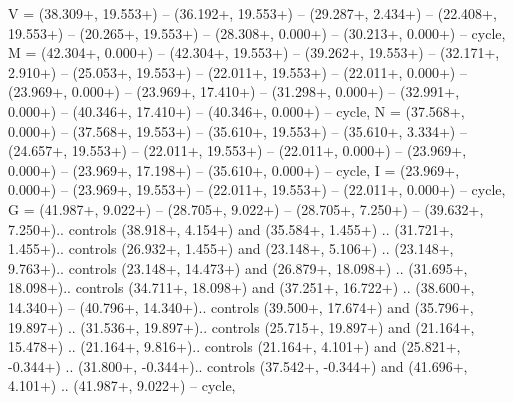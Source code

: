 {V} = {(38.309+\ctpXshift, 19.553+\ctpYshift) -- (36.192+\ctpXshift, 19.553+\ctpYshift) -- (29.287+\ctpXshift, 2.434+\ctpYshift) -- (22.408+\ctpXshift, 19.553+\ctpYshift) -- (20.265+\ctpXshift, 19.553+\ctpYshift) -- (28.308+\ctpXshift, 0.000+\ctpYshift) -- (30.213+\ctpXshift, 0.000+\ctpYshift) -- cycle},
{M} = {(42.304+\ctpXshift, 0.000+\ctpYshift) -- (42.304+\ctpXshift, 19.553+\ctpYshift) -- (39.262+\ctpXshift, 19.553+\ctpYshift) -- (32.171+\ctpXshift, 2.910+\ctpYshift) -- (25.053+\ctpXshift, 19.553+\ctpYshift) -- (22.011+\ctpXshift, 19.553+\ctpYshift) -- (22.011+\ctpXshift, 0.000+\ctpYshift) -- (23.969+\ctpXshift, 0.000+\ctpYshift) -- (23.969+\ctpXshift, 17.410+\ctpYshift) -- (31.298+\ctpXshift, 0.000+\ctpYshift) -- (32.991+\ctpXshift, 0.000+\ctpYshift) -- (40.346+\ctpXshift, 17.410+\ctpYshift) -- (40.346+\ctpXshift, 0.000+\ctpYshift) -- cycle},
{N} = {(37.568+\ctpXshift, 0.000+\ctpYshift) -- (37.568+\ctpXshift, 19.553+\ctpYshift) -- (35.610+\ctpXshift, 19.553+\ctpYshift) -- (35.610+\ctpXshift, 3.334+\ctpYshift) -- (24.657+\ctpXshift, 19.553+\ctpYshift) -- (22.011+\ctpXshift, 19.553+\ctpYshift) -- (22.011+\ctpXshift, 0.000+\ctpYshift) -- (23.969+\ctpXshift, 0.000+\ctpYshift) -- (23.969+\ctpXshift, 17.198+\ctpYshift) -- (35.610+\ctpXshift, 0.000+\ctpYshift) -- cycle},
{I} = {(23.969+\ctpXshift, 0.000+\ctpYshift) -- (23.969+\ctpXshift, 19.553+\ctpYshift) -- (22.011+\ctpXshift, 19.553+\ctpYshift) -- (22.011+\ctpXshift, 0.000+\ctpYshift) -- cycle},
{G} = {(41.987+\ctpXshift, 9.022+\ctpYshift) -- (28.705+\ctpXshift, 9.022+\ctpYshift) -- (28.705+\ctpXshift, 7.250+\ctpYshift) -- (39.632+\ctpXshift, 7.250+\ctpYshift).. controls (38.918+\ctpXshift, 4.154+\ctpYshift) and (35.584+\ctpXshift, 1.455+\ctpYshift) .. (31.721+\ctpXshift, 1.455+\ctpYshift).. controls (26.932+\ctpXshift, 1.455+\ctpYshift) and (23.148+\ctpXshift, 5.106+\ctpYshift) .. (23.148+\ctpXshift, 9.763+\ctpYshift).. controls (23.148+\ctpXshift, 14.473+\ctpYshift) and (26.879+\ctpXshift, 18.098+\ctpYshift) .. (31.695+\ctpXshift, 18.098+\ctpYshift).. controls (34.711+\ctpXshift, 18.098+\ctpYshift) and (37.251+\ctpXshift, 16.722+\ctpYshift) .. (38.600+\ctpXshift, 14.340+\ctpYshift) -- (40.796+\ctpXshift, 14.340+\ctpYshift).. controls (39.500+\ctpXshift, 17.674+\ctpYshift) and (35.796+\ctpXshift, 19.897+\ctpYshift) .. (31.536+\ctpXshift, 19.897+\ctpYshift).. controls (25.715+\ctpXshift, 19.897+\ctpYshift) and (21.164+\ctpXshift, 15.478+\ctpYshift) .. (21.164+\ctpXshift, 9.816+\ctpYshift).. controls (21.164+\ctpXshift, 4.101+\ctpYshift) and (25.821+\ctpXshift, -0.344+\ctpYshift) .. (31.800+\ctpXshift, -0.344+\ctpYshift).. controls (37.542+\ctpXshift, -0.344+\ctpYshift) and (41.696+\ctpXshift, 4.101+\ctpYshift) .. (41.987+\ctpXshift, 9.022+\ctpYshift) -- cycle},
